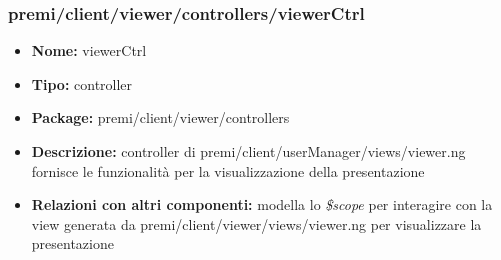 \subsubsection{premi/client/viewer/controllers/viewerCtrl}
\begin{itemize}
  \item[] \textbf{Nome:} viewerCtrl
  \item[] \textbf{Tipo:} controller
  \item[] \textbf{Package:} premi/client/viewer/controllers
  \item[] \textbf{Descrizione:} controller di premi/client/userManager/views/viewer.ng fornisce le funzionalità per la visualizzazione della presentazione
  \item[] \textbf{Relazioni con altri componenti:} modella lo \textit{\$scope} per interagire con la view generata da premi/client/viewer/views/viewer.ng per visualizzare la presentazione
\end{itemize}

















